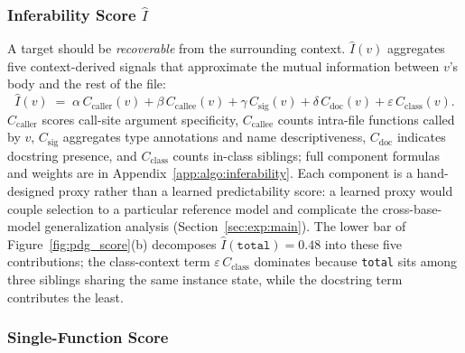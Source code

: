 \subsubsection{Inferability Score $\hat{I}$}
\label{sec:method:inferability}

A target should be \emph{recoverable} from the surrounding context.
$\hat{I}(v)$ aggregates five context-derived signals that approximate the
mutual information between $v$'s body and the rest of the file:
%
\begin{equation}
  \hat{I}(v) \;=\; \alpha\,C_{\mathrm{caller}}(v)
              + \beta\,C_{\mathrm{callee}}(v)
              + \gamma\,C_{\mathrm{sig}}(v)
              + \delta\,C_{\mathrm{doc}}(v)
              + \varepsilon\,C_{\mathrm{class}}(v).
  \label{eq:inferability}
\end{equation}
%
$C_{\mathrm{caller}}$ scores call-site argument specificity,
$C_{\mathrm{callee}}$ counts intra-file functions called by $v$,
$C_{\mathrm{sig}}$ aggregates type annotations and name descriptiveness,
$C_{\mathrm{doc}}$ indicates docstring presence, and
$C_{\mathrm{class}}$ counts in-class siblings; full component formulas
and weights are in Appendix~\ref{app:algo:inferability}. Each component
is a hand-designed proxy rather than a learned predictability score: a
learned proxy would couple selection to a particular reference model and
complicate the cross-base-model generalization analysis
(Section~\ref{sec:exp:main}). The lower bar of
Figure~\ref{fig:pdg_score}(b) decomposes
$\hat{I}(\texttt{total})\!=\!0.48$ into these five contributions; the
class-context term $\varepsilon\,C_{\mathrm{class}}$ dominates because
\texttt{total} sits among three siblings sharing the same instance
state, while the docstring term contributes the least.

\subsubsection{Single-Function Score}
\label{sec:method:single}

